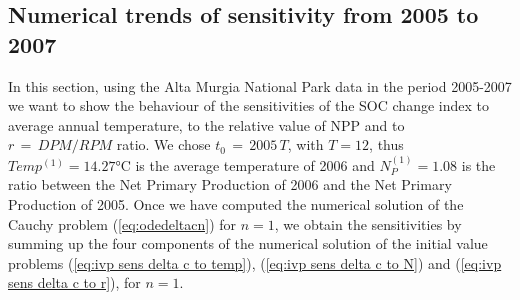 \subsection{Numerical trends of sensitivity from 2005 to 2007}
In this section, using the Alta Murgia National Park data in the period %
2005-2007
we want to show the behaviour of the sensitivities of the SOC change index to average annual temperature, to the relative value of NPP and to $r\,=\,DPM / RPM$ ratio. We chose  $t_0\,=\,2005\, T$, with $T=12$, thus $Temp^{(1)}=14.27 $°C is the average temperature of 2006 and $N_P^{(1)}=1.08$ is the ratio between the Net Primary Production of 2006 and the Net Primary Production of 2005.
Once we have computed the numerical solution of the Cauchy problem (\ref{eq:odedeltacn})
for $n=1$, we obtain the  sensitivities by summing up the four components of the numerical solution of the initial value problems 
(\ref{eq:ivp sens delta c to temp}), (\ref{eq:ivp sens delta c to N}) and (\ref{eq:ivp sens delta c to r}), for $n=1$.\\

